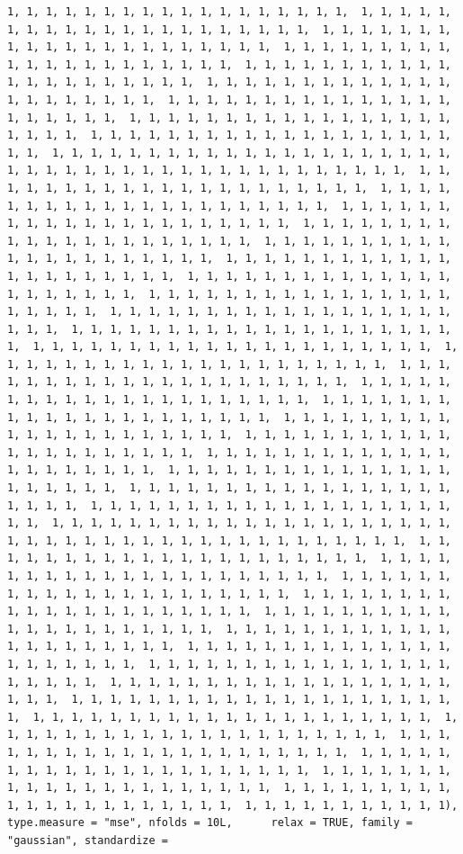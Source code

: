 \documentclass[
]{article}
\begin{document}
\begin{verbatim}
1, 1, 1, 1, 1, 1, 1, 1, 1, 1, 1, 1, 1, 1, 1, 1, 1, 1,  1, 1, 1, 1, 1, 1, 1, 1, 1, 1, 1, 1, 1, 1, 1, 1, 1, 1, 1, 1, 1,  1, 1, 1, 1, 1, 1, 1, 1, 1, 1, 1, 1, 1, 1, 1, 1, 1, 1, 1, 1, 1,  1, 1, 1, 1, 1, 1, 1, 1, 1, 1, 1, 1, 1, 1, 1, 1, 1, 1, 1, 1, 1,  1, 1, 1, 1, 1, 1, 1, 1, 1, 1, 1, 1, 1, 1, 1, 1, 1, 1, 1, 1, 1,  1, 1, 1, 1, 1, 1, 1, 1, 1, 1, 1, 1, 1, 1, 1, 1, 1, 1, 1, 1, 1,  1, 1, 1, 1, 1, 1, 1, 1, 1, 1, 1, 1, 1, 1, 1, 1, 1, 1, 1, 1, 1,  1, 1, 1, 1, 1, 1, 1, 1, 1, 1, 1, 1, 1, 1, 1, 1, 1, 1, 1, 1, 1,  1, 1, 1, 1, 1, 1, 1, 1, 1, 1, 1, 1, 1, 1, 1, 1, 1, 1, 1, 1, 1,  1, 1, 1, 1, 1, 1, 1, 1, 1, 1, 1, 1, 1, 1, 1, 1, 1, 1, 1, 1, 1,  1, 1, 1, 1, 1, 1, 1, 1, 1, 1, 1, 1, 1, 1, 1, 1, 1, 1, 1, 1, 1,  1, 1, 1, 1, 1, 1, 1, 1, 1, 1, 1, 1, 1, 1, 1, 1, 1, 1, 1, 1, 1,  1, 1, 1, 1, 1, 1, 1, 1, 1, 1, 1, 1, 1, 1, 1, 1, 1, 1, 1, 1, 1,  1, 1, 1, 1, 1, 1, 1, 1, 1, 1, 1, 1, 1, 1, 1, 1, 1, 1, 1, 1, 1,  1, 1, 1, 1, 1, 1, 1, 1, 1, 1, 1, 1, 1, 1, 1, 1, 1, 1, 1, 1, 1,  1, 1, 1, 1, 1, 1, 1, 1, 1, 1, 1, 1, 1, 1, 1, 1, 1, 1, 1, 1, 1,  1, 1, 1, 1, 1, 1, 1, 1, 1, 1, 1, 1, 1, 1, 1, 1, 1, 1, 1, 1, 1,  1, 1, 1, 1, 1, 1, 1, 1, 1, 1, 1, 1, 1, 1, 1, 1, 1, 1, 1, 1, 1,  1, 1, 1, 1, 1, 1, 1, 1, 1, 1, 1, 1, 1, 1, 1, 1, 1, 1, 1, 1, 1,  1, 1, 1, 1, 1, 1, 1, 1, 1, 1, 1, 1, 1, 1, 1, 1, 1, 1, 1, 1, 1,  1, 1, 1, 1, 1, 1, 1, 1, 1, 1, 1, 1, 1, 1, 1, 1, 1, 1, 1, 1, 1,  1, 1, 1, 1, 1, 1, 1, 1, 1, 1, 1, 1, 1, 1, 1, 1, 1, 1, 1, 1, 1,  1, 1, 1, 1, 1, 1, 1, 1, 1, 1, 1, 1, 1, 1, 1, 1, 1, 1, 1, 1, 1,  1, 1, 1, 1, 1, 1, 1, 1, 1, 1, 1, 1, 1, 1, 1, 1, 1, 1, 1, 1, 1,  1, 1, 1, 1, 1, 1, 1, 1, 1, 1, 1, 1, 1, 1, 1, 1, 1, 1, 1, 1, 1,  1, 1, 1, 1, 1, 1, 1, 1, 1, 1, 1, 1, 1, 1, 1, 1, 1, 1, 1, 1, 1,  1, 1, 1, 1, 1, 1, 1, 1, 1, 1, 1, 1, 1, 1, 1, 1, 1, 1, 1, 1, 1,  1, 1, 1, 1, 1, 1, 1, 1, 1, 1, 1, 1, 1, 1, 1, 1, 1, 1, 1, 1, 1,  1, 1, 1, 1, 1, 1, 1, 1, 1, 1, 1, 1, 1, 1, 1, 1, 1, 1, 1, 1, 1,  1, 1, 1, 1, 1, 1, 1, 1, 1, 1, 1, 1, 1, 1, 1, 1, 1, 1, 1, 1, 1,  1, 1, 1, 1, 1, 1, 1, 1, 1, 1, 1, 1, 1, 1, 1, 1, 1, 1, 1, 1, 1,  1, 1, 1, 1, 1, 1, 1, 1, 1, 1, 1, 1, 1, 1, 1, 1, 1, 1, 1, 1, 1,  1, 1, 1, 1, 1, 1, 1, 1, 1, 1, 1, 1, 1, 1, 1, 1, 1, 1, 1, 1, 1,  1, 1, 1, 1, 1, 1, 1, 1, 1, 1, 1, 1, 1, 1, 1, 1, 1, 1, 1, 1, 1,  1, 1, 1, 1, 1, 1, 1, 1, 1, 1, 1, 1, 1, 1, 1, 1, 1, 1, 1, 1, 1,  1, 1, 1, 1, 1, 1, 1, 1, 1, 1, 1, 1, 1, 1, 1, 1, 1, 1, 1, 1, 1,  1, 1, 1, 1, 1, 1, 1, 1, 1, 1, 1, 1, 1, 1, 1, 1, 1, 1, 1, 1, 1,  1, 1, 1, 1, 1, 1, 1, 1, 1, 1, 1, 1, 1, 1, 1, 1, 1, 1, 1, 1, 1,  1, 1, 1, 1, 1, 1, 1, 1, 1, 1, 1, 1, 1, 1, 1, 1, 1, 1, 1, 1, 1,  1, 1, 1, 1, 1, 1, 1, 1, 1, 1, 1, 1, 1, 1, 1, 1, 1, 1, 1, 1, 1,  1, 1, 1, 1, 1, 1, 1, 1, 1, 1, 1, 1, 1, 1, 1, 1, 1, 1, 1, 1, 1,  1, 1, 1, 1, 1, 1, 1, 1, 1, 1, 1, 1, 1, 1, 1, 1, 1, 1, 1, 1, 1,  1, 1, 1, 1, 1, 1, 1, 1, 1, 1, 1, 1, 1, 1, 1, 1, 1, 1, 1, 1, 1,  1, 1, 1, 1, 1, 1, 1, 1, 1, 1, 1, 1, 1, 1, 1, 1, 1, 1, 1, 1, 1,  1, 1, 1, 1, 1, 1, 1, 1, 1, 1, 1, 1, 1, 1, 1, 1, 1, 1, 1, 1, 1,  1, 1, 1, 1, 1, 1, 1, 1, 1, 1, 1, 1, 1, 1, 1, 1, 1, 1, 1, 1, 1,  1, 1, 1, 1, 1, 1, 1, 1, 1, 1, 1, 1, 1, 1, 1, 1, 1, 1, 1, 1, 1,  1, 1, 1, 1, 1, 1, 1, 1, 1, 1, 1, 1, 1, 1, 1, 1, 1, 1, 1, 1, 1,  1, 1, 1, 1, 1, 1, 1, 1, 1, 1, 1, 1, 1, 1, 1, 1, 1, 1, 1, 1, 1,  1, 1, 1, 1, 1, 1, 1, 1, 1, 1, 1, 1, 1, 1, 1, 1, 1, 1, 1, 1, 1,  1, 1, 1, 1, 1, 1, 1, 1, 1, 1, 1), type.measure = "mse", nfolds = 10L,      relax = TRUE, family = "gaussian", standardize = 
\end{verbatim}
\end{document}
